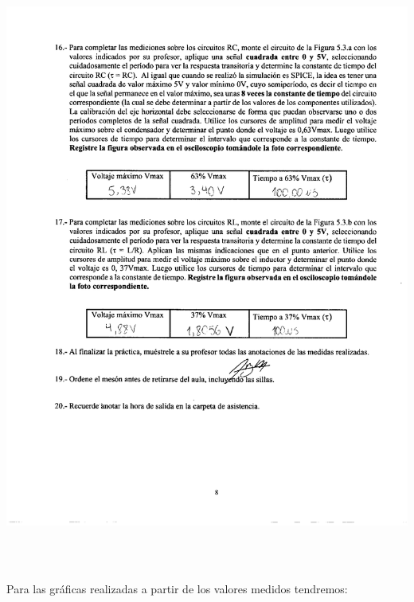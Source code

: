 \documentclass[12pt]{article}
\begin{document}
	\begin{center}
		\includegraphics[width=16cm,height=20cm]{Img/anexo_0006}
	\end{center}

	\newpage

	\noindent Para las gráficas realizadas a partir de los valores medidos tendremos:
	
	
	\renewcommand{\theenumi}{\alph{enumi}} %
	
\end{document}
